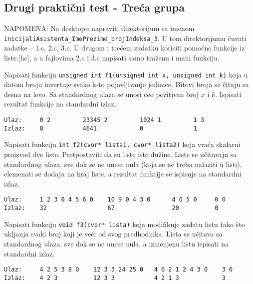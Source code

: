 \subsection{Drugi prakti\v cni test - Tre\' ca grupa}

NAPOMENA: Na desktopu napraviti direktorijum sa imenom
\verb|inicijaliAsistenta_ImePrezime_brojIndeksa_3|.  U tom
direktorijumu \v cuvati zadatke -- 1.c, 2.c, 3.c. U drugom i tre\' cem
zadatku korisiti pomo\' cne funkcije iz liste.[hc], a u fajlovima 2.c
i 3.c napisati samo tra\v zenu i main funkciju.

\setcounter{z}{0}

\begin{z}
  Napisati funkciju {\tt unsigned int f1(unsigned int x, unsigned int
    k)} koja u datom broju invertuje svako k-to pojavljivanje
  jedinice.  Bitovi broja se \v citaju sa desna na levo. Sa
  standardnog ulaza se unosi ceo pozitivan broj $x$ i $k$. Ispisati
  rezultat funkcije na standardni izlaz.
\end{z}
\begin{verbatim}
Ulaz:     0 2         23345 2         1024 1         1 3
Izlaz:    0           4641            0              1
\end{verbatim}

\begin{z}
  Napisati funkciju {\tt int f2(cvor* lista1, cvor* lista2)} koja
  vra\'ca skalarni proizvod dve liste. Pretpostaviti da su liste iste
  du\v zine. Liste se u\v citavaju sa standardnog ulaza, sve dok se ne
  unese nula (koja se ne treba nalaziti u listi), elemenati se dodaju
  na kraj liste, a rezultat funkcije se ispisuje na standardni izlaz.
\end{z}
\begin{verbatim}
Ulaz:     1 2 3 0 4 5 6 0    10 9 0 4 3 0      4 0 5 0     0 0
Izlaz:    32                 67                20          0
\end{verbatim}

\begin{z}
  Napisati funkciju {\tt void f3(cvor* lista)} koja modifikuje zadatu
  listu tako \v sto ukljanja svaki broj koji je ve\' ci od svog
  predhodnika.  Lista se u\v citava sa standardnog ulaza, sve dok se
  ne unese nula, a izmenjenu listu ispisati na standardni izlaz.
\end{z}
\begin{verbatim}
Ulaz:     4 2 5 3 8 0    12 3 3 24 25 0   4 6 2 1 2 4 3 0    3 0
Izlaz:    4 2 3          12 3 3           4 2 1 3            3
\end{verbatim}

